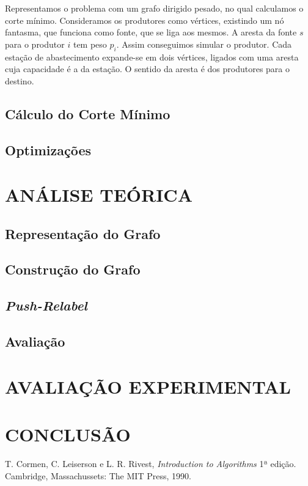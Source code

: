 \documentclass[a4paper, 12pt, conference, portuguese]{ieeeconf}
\begin{document}
Representamos o problema com um grafo dirigido pesado, no qual
calculamos o corte mínimo. Consideramos os produtores como
vértices, existindo um nó fantasma, que funciona como fonte, que
se liga aos mesmos. A aresta da fonte $s$ para o produtor $i$ tem
peso $p_i$. Assim conseguimos simular o produtor. Cada estação de
abastecimento expande-se em dois vértices, ligados com uma aresta
cuja capacidade é a da estação. O sentido da aresta é dos produtores
para o destino.

\subsection{Cálculo do Corte Mínimo}
\subsection{Optimizações}

\section{ANÁLISE TEÓRICA}\label{theoric}

\subsection{Representação do Grafo}
\subsection{Construção do Grafo}
\subsection{\textit{Push-Relabel}}
\subsection{Avaliação}

\section{AVALIAÇÃO EXPERIMENTAL}\label{experimental}

\section{CONCLUSÃO}\label{conclusion}


\begin{thebibliography}{99}
   T. Cormen, C. Leiserson e L. R. Rivest, \textit{Introduction
    to Algorithms} 1ª edição. Cambridge, Massachussets: The MIT Press,
    1990.
\end{thebibliography}
\end{document}
